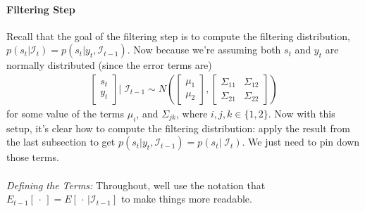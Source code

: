 \documentclass[a4paper,12pt]{article}
\begin{document}
\paragraph{Filtering Step}
Recall that the goal of the filtering step is to compute the
filtering distribution, $p(s_t|\mathcal{I}_{t})=p(s_t|y_t,
\mathcal{I}_{t-1})$. Now because we're assuming both $s_t$ and $y_t$ are
normally distributed (since the error terms are)
\begin{align*}
  \begin{bmatrix} s_t \\ y_t \end{bmatrix} | \;
  \mathcal{I}_{t-1}
  \sim
  N\left(\begin{bmatrix} \mu_1 \\ \mu_2 \end{bmatrix},
  \begin{bmatrix} \Sigma_{11} & \Sigma_{12} \\
  \Sigma_{21} & \Sigma_{22} \end{bmatrix}
  \right)
\end{align*}
for some value of the terms $\mu_{i}$, and $\Sigma_{jk}$, where $i, j,
k\in\{1,2\}$. Now with this setup, it's clear how to compute the
filtering distribution: apply the result from the last subsection to get
$p(s_t|y_t, \mathcal{I}_{t-1}) = p(s_t | \;\mathcal{I}_{t})$. We just
need to pin down those terms.
\\
\\
{\sl Defining the Terms:} \/Throughout, well use the notation that
$E_{t-1}[\,\cdot\,] = E[\,\cdot\,|\mathcal{I}_{t-1}]$ to make things
more readable.
\end{document}
